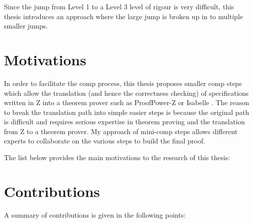 Since the jump from Level 1 to a Level 3 level of rigour is very difficult, this thesis introduces an approach where the large jump is broken up in to multiple smaller jumps.

\section{Motivations}

In order to facilitate the \gls{comp} process, this thesis proposes smaller \gls{comp} steps which allow the translation (and hence the correctness checking) of specifications written in Z into a theorem prover such as ProofPower-Z \cite{pp} or Isabelle \cite{isabelle}.
The reason to break the translation path into simple easier steps is because the original path is difficult and requires serious expertise in theorem proving and the translation from Z to a theorem prover. My approach of mini-\gls{comp} steps allows different experts to collaborate on the various steps to build the final proof.

The list below provides the main motivations to the research of this thesis:

\section{Contributions}

A summary of contributions is given in the following points:

